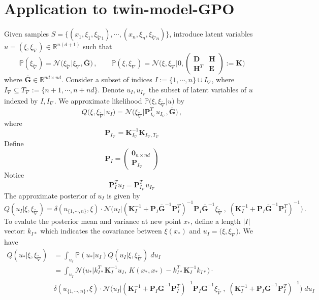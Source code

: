 \documentclass[a4paper,onecolumn]{article}
\begin{document}
\section{Application to twin-model-GPO}
Given samples $S=\{(x_1, \xi_1, \xi_{\tilde{\nabla}1}), \cdots, (x_n, \xi_n, \xi_{\tilde{\nabla}n})\}$, introduce
latent variables $u=(\xi,\xi_{\nabla})\in\mathbb{R}^{n(d+1)}$ such that
$$
    \mathbb{P}(\xi_{\tilde{\nabla}}) = \mathcal{N}\big( \xi_{\tilde{\nabla}}\big| \xi_{\nabla}, \bar{\mathbf{G}} \big)\,, 
    \qquad
    \mathbb{P}(\xi, \xi_\nabla) = \mathcal{N}\big(\xi, \xi_{\nabla}\big| 0, 
     \begin{pmatrix} 
         \mathbf{D} & \mathbf{H}\\
         \mathbf{H}^T & \mathbf{E}
     \end{pmatrix} := \mathbf{K}
     \big)
$$
where $\bar{\mathbf{G}}\in\mathbb{R}^{nd\times nd}$.
Consider a subset of indices $I:=\{1,\cdots, n\}\cup I_\nabla $, where 
$I_\nabla \subseteq T_{\nabla}:=\{n+1,\cdots, n+nd\}$.
Denote $u_I, u_{I_\nabla}$ the subset of latent variables of $u$ indexed by $I, I_\nabla$.
We approximate likelihood $\mathbb{P}\big( \xi, \xi_{\tilde{\nabla}} \big| u\big)$ by
$$
    Q\big( \xi, \xi_{\tilde{\nabla}} \big| u_I\big) =
    \mathcal{N}\big(\xi_{\tilde{\nabla}}\big|\mathbf{P}_{I_\nabla}^T u_{I_\nabla}, \bar{\mathbf{G}}\big)
    \,,
$$
where 
$$
    \mathbf{P}_{I_\nabla} = \mathbf{K}_{I_\nabla}^{-1} \mathbf{K}_{I_\nabla, T_\nabla}
$$
Define 
$$
    \mathbf{P}_I = \begin{pmatrix} \mathbf{0}_{n\times nd} \\ \mathbf{P}_{I_\nabla}\end{pmatrix}
$$
Notice 
$$
    \mathbf{P}_I^T u_I =  \mathbf{P}_{I_\nabla}^T u_{I_\nabla}
$$
The approximate posterior of $u_I$ is given by
$$
    Q(u_I|\xi,\xi_{\tilde{\nabla}}) = \delta(u_{\{1,\cdots, n\}}, \xi) \cdot
    \mathcal{N}\Big( u_I\Big| (\mathbf{K}_I^{-1} + \mathbf{P}_I\bar{\mathbf{G}}^{-1} \mathbf{P}_I^T)^{-1}
    \mathbf{P}_I\bar{\mathbf{G}}^{-1}\xi_{\tilde{\nabla}}\,,\;
    (\mathbf{K}_I^{-1} + \mathbf{P}_I \bar{\mathbf{G}}^{-1} \mathbf{P}_I^T)^{-1} \Big)\,.
$$
To evalute the posterior mean and variance at new point $x_*$, define a length $\big|I\big|$ vector:
$k_{I*}$
which indicates the covariance between $\xi(x_*)$ and $u_I = \big(\xi,\xi_\nabla\big)$.
We have
\begin{equation*}\begin{split}
    Q(u_*|\xi,\xi_{\tilde{\nabla}}) &= \int_{u_I} \mathbb{P}(u_*|u_I) Q(u_I|\xi,\xi_{\tilde{\nabla}}) \;d u_I\\
    &= \int_{u_I} \mathcal{N}\big(
        u_*\big| k_{I*}^T \mathbf{K}_I^{-1} u_I,\, K(x_*, x_*) - k_{I*}^T\mathbf{K}_I^{-1} k_{I*} \big) \cdot\\
    \quad &
   \delta(u_{\{1,\cdots, n\}}, \xi) \cdot
    \mathcal{N}\Big( u_I\Big| (\mathbf{K}_I^{-1} + \mathbf{P}_I\bar{\mathbf{G}}^{-1} \mathbf{P}_I^T)^{-1}
    \mathbf{P}_I\bar{\mathbf{G}}^{-1}\xi_{\tilde{\nabla}}\,,\;
    (\mathbf{K}_I^{-1} + \mathbf{P}_I \bar{\mathbf{G}}^{-1} \mathbf{P}_I^T)^{-1} \Big)
\; du_I
\end{split}\end{equation*}
\end{document}
